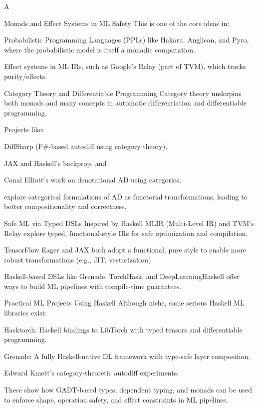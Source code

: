 \documentclass[11pt, a4paper]{article}
\begin{document}
\begin{section}{A}
\begin{subsection}{Monads and Effect Systems in ML Safety}
This is one of the core ideas in:

Probabilistic Programming Languages (PPLs) like Hakaru, Anglican, and Pyro, where the probabilistic model is itself a monadic computation.

Effect systems in ML IRs, such as Google's Relay (part of TVM), which tracks purity/effects.
\end{subsection}

\begin{subsection}{Category Theory and Differentiable Programming}
Category theory underpins both monads and many concepts in automatic differentiation and differentiable programming.

Projects like:

DiffSharp (F\#-based autodiff using category theory),

JAX and Haskell's backprop, and

Conal Elliott’s work on denotational AD using categories,

explore categorical formulations of AD as functorial transformations, leading to better compositionality and correctness.
\end{subsection}

\begin{subsection}{Safe ML via Typed DSLs} Inspired by Haskell
MLIR (Multi-Level IR) and TVM’s Relay explore typed, functional-style IRs for safe optimization and compilation.

TensorFlow Eager and JAX both adopt a functional, pure style to enable more robust transformations (e.g., JIT, vectorization).

Haskell-based DSLs like Grenade, TorchHask, and DeepLearningHaskell offer ways to build ML pipelines with compile-time guarantees.
\end{subsection}

\begin{subsection}{Practical ML Projects Using Haskell}
Although niche, some serious Haskell ML libraries exist:

Hasktorch: Haskell bindings to LibTorch with typed tensors and differentiable programming.

Grenade: A fully Haskell-native DL framework with type-safe layer composition.

Edward Kmett’s category-theoretic autodiff experiments.

These show how GADT-based types, dependent typing, and monads can be used to enforce shape, operation safety, and effect constraints in ML pipelines.
\end{subsection}


\end{section}
\end{document}

